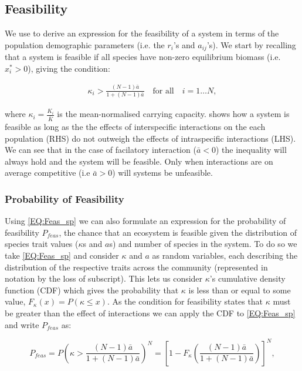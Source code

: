 \documentclass{article}
\begin{document}
\subsection{Feasibility} \label{Sec:Feasibility}
We use  to derive an expression for the feasibility of a system in terms of the population demographic parameters (i.e. the $r_i$'s and $a_{ij}$'s). We start by recalling that a system is feasible if all species have non-zero equilibrium biomass (i.e. $x_i^* > 0 $), giving the condition:

\begin{align} \label{EQ:Feas_sp}
  \kappa_i > \frac{(N-1)\bar{a}}{1 + (N-1)\bar{a}} \quad \text{for all} \quad i = 1 \ldots N,
\end{align}

where $\kappa_i = \frac{K_i}{\bar{K}}$ is the mean-normalised carrying capacity.  shows how a system is feasible as long as the the effects of interspecific interactions on the each population (RHS) do not outweigh the effects of intraspecific interactions (LHS). We can see that in the case of facilatory interaction ($\bar{a} < 0$) the inequality will always hold and the system will be feasible. Only when interactions are on average competitive (i.e $\bar{a} > 0$) will systems be unfeasible. 

\subsubsection{Probability of Feasibility}

Using \cref{EQ:Feas_sp} we can also formulate an expression for the probability of feasibility $P_{feas}$, the chance that an ecosystem is feasible given the distribution of species trait values ($\kappa$s and $a$s) and number of species in the system. To do so we take \cref{EQ:Feas_sp} and consider $\kappa$ and $a$ as random variables, each describing the distribution of the respective traits across the community (represented in notation by the loss of subscript). This lets us consider $\kappa$'s cumulative density function (CDF) which gives the probability that $\kappa$ is less than or equal to some value, $F_{\kappa}(x) = P(\kappa \leq x)$. As the condition for feasibility states that $\kappa$ must be greater than the effect of interactions we can apply the CDF to \cref{EQ:Feas_sp} and write $P_{feas}$ as:

\begin{equation} \label{EQ:P_feas}
    P_{feas} = P \left( \kappa > \frac{(N-1)\bar{a}}{1 + (N-1)\bar{a}}  \right)^N = 
    \left[1 - F_{\kappa}\left(\frac{(N-1)\bar{a}}{1 + (N-1)\bar{a}}\right)\right]^N,
\end{equation}
\end{document}
